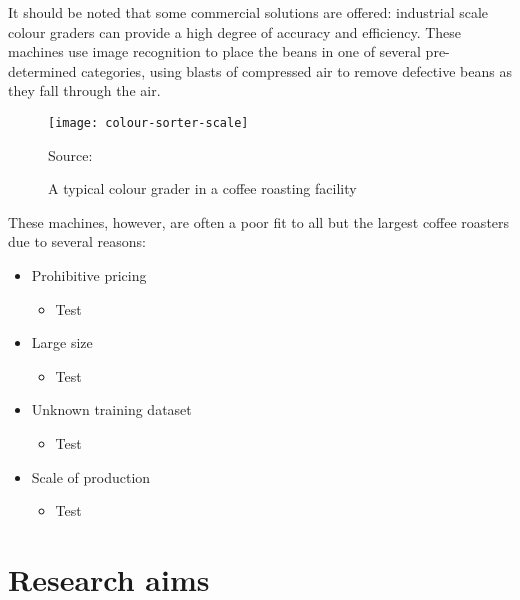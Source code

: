 It should be noted that some commercial solutions are offered:
industrial scale colour graders can provide a high degree of accuracy and efficiency.
These machines use image recognition to place the beans in one of several pre-determined categories,
using blasts of compressed air to remove defective beans as they fall through the air.
\begin{wrapfigure}{r}{0.5\textwidth}
    \texttt{[image: colour-sorter-scale]}
    \caption*{Source: \cite{colourSorterImg}}
    \caption{A typical colour grader in a coffee roasting facility}
    \label{fig:colourSorterExample}
\end{wrapfigure}
These machines, however, are often a poor fit to all but the largest coffee roasters due to several reasons:
\begin{itemize}
    \item Prohibitive pricing
    \begin{itemize}
        \item Test
    \end{itemize}
    \item Large size
    \begin{itemize}
        \item Test
    \end{itemize}
    \item Unknown training dataset
    \begin{itemize}
        \item Test
    \end{itemize}
    \item Scale of production
    \begin{itemize}
        \item Test
    \end{itemize}
\end{itemize}


\section{Research aims}\label{sec:research-aims}